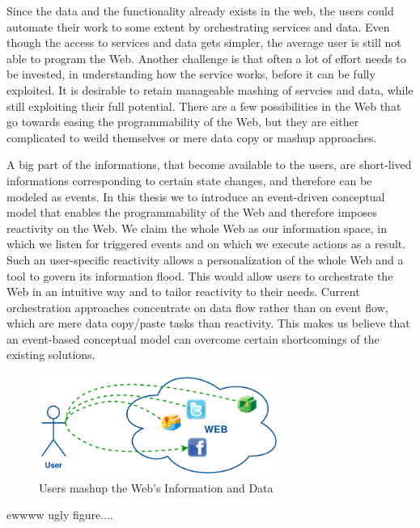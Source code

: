 Since the data and the functionality already exists in the web, the users could automate their work to some extent by orchestrating services and data.
Even though the access to services and data gets simpler, the average user is still not able to program the Web.
Another challenge is that often a lot of effort needs to be invested, in understanding how the service works, before it can be fully exploited.
It is desirable to retain manageable mashing of servcies and data, while still exploiting their full potential.
There are a few possibilities in the Web that go towards easing the programmability of the Web, but they are either complicated to weild themselves or mere data copy or mashup approaches.

A big part of the informations, that become available to the users, are short-lived informations corresponding to certain state changes, and therefore can be modeled as events.
In this thesis we to introduce an event-driven conceptual model that enables the programmability of the Web and therefore imposes reactivity on the Web.
We claim the whole Web as our information space, in which we listen for triggered events and on which we execute actions as a result.
Such an user-specific reactivity allows a personalization of the whole Web and a tool to govern its information flood.
This would allow users to orchestrate the Web in an intuitive way and to tailor reactivity to their needs.
Current orchestration approaches concentrate on data flow rather than on event flow, which are mere data copy/paste tasks than reactivity.
This makes us believe that an event-based conceptual model can overcome certain shortcomings of the existing solutions.

\begin{figure}[!ht]
  \centering
  \includegraphics[width=0.7\textwidth]{figures/UsersWeildServicesInTheWeb}
  \caption{Users mashup the Web's Information and Data}
  \label{fig:UsersWeildServicesInTheWeb}
\end{figure}
ewwww ugly figure....

